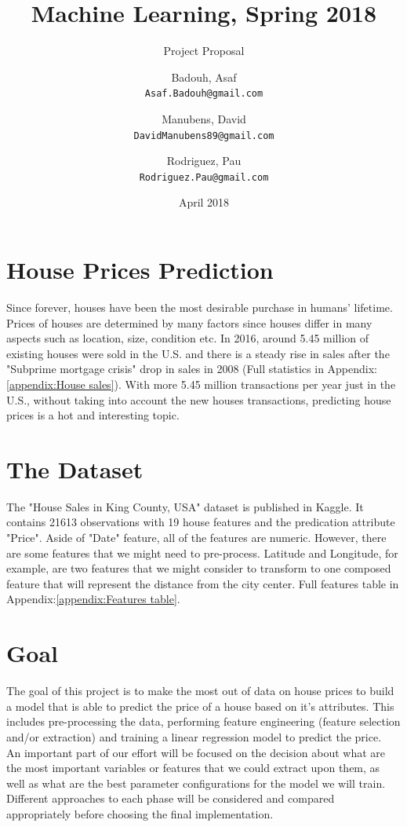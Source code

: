 \documentclass{scrartcl}
\title{Machine Learning, Spring 2018}
\subtitle{Project Proposal}
\author{
  Badouh, Asaf\\
  \texttt{Asaf.Badouh@gmail.com}
  \and
  Manubens, David\\
  \texttt{DavidManubens89@gmail.com}
  \and
  Rodriguez, Pau\\
  \texttt{Rodriguez.Pau@gmail.com}
}
\date{April 2018}
\begin{document}
\maketitle
\newpage

\section{House Prices Prediction}
Since forever, houses have been the most desirable purchase in humans' lifetime. Prices of houses are determined by many factors since houses differ in many aspects such as location, size, condition etc. In 2016, around 5.45 million of existing houses were sold in the U.S.\cite{statista} and there is a steady rise in sales after the "Subprime mortgage crisis" drop in sales in 2008 (Full statistics in Appendix:\ref{appendix:House sales}). With more 5.45 million transactions per year just in the U.S., without taking into account the new houses transactions, predicting house prices is a hot and interesting topic.

\section{The Dataset}
The "House Sales in King County, USA" dataset is published in Kaggle\cite{DB}. It contains 21613 observations with 19 house features and the predication attribute "Price".
Aside of "Date" feature, all of the features are numeric. However, there are some features that we might need to pre-process. Latitude and Longitude, for example, are two features that we might consider to transform to one composed feature that will represent the distance from the city center.
Full features table in Appendix:\ref{appendix:Features table}.

\section{Goal}
The goal of this project is to make the most out of data on house prices to build a model that is able to predict the price of a house based on it's attributes.
This includes pre-processing the data, performing feature engineering (feature selection and/or extraction) and training a linear regression model to predict the price. \\
An important part of our effort will be focused on the decision about what are the most important variables or features that we could extract upon them, as well as what are the best parameter configurations for the model we will train. Different approaches to each phase will be considered and compared appropriately before choosing the final implementation.
\end{document}
